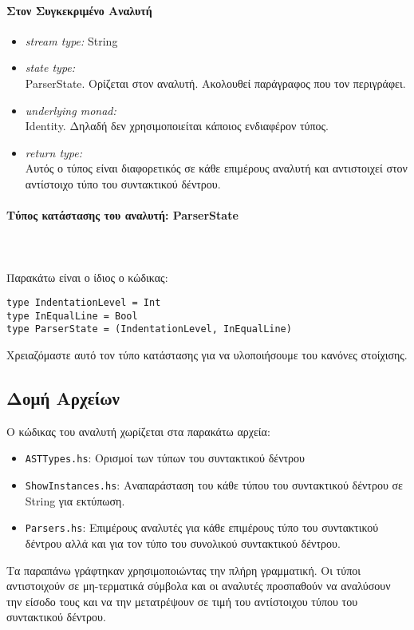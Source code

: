 \documentclass[diploma]{softlab-thesis}
\def\pend{\mbox{}\\\\}
\begin{document}
\paragraph{Στον Συγκεκριμένο Αναλυτή}
\begin{itemize}
\item
  \textit{stream type:} String
\item
  \textit{state type:}
  \\ParserState. Ορίζεται στον αναλυτή. Ακολουθεί παράγραφος που τον
  περιγράφει.
\item
  \textit{underlying monad:}
  \\
  Identity. Δηλαδή δεν χρησιμοποιείται κάποιος ενδιαφέρον τύπος.
\item
  \textit{return type:}
  \\
  Αυτός ο τύπος είναι διαφορετικός σε κάθε επιμέρους αναλυτή και αντιστοιχεί
  στον αντίστοιχο τύπο του συντακτικού δέντρου.
\end{itemize}

\paragraph{Τύπος κατάστασης του αναλυτή: ParserState}\pend
Παρακάτω είναι ο ίδιος ο κώδικας:
\begin{verbatim}
type IndentationLevel = Int
type InEqualLine = Bool
type ParserState = (IndentationLevel, InEqualLine)
\end{verbatim}
Χρειαζόμαστε αυτό τον τύπο κατάστασης για να υλοποιήσουμε του κανόνες
στοίχισης.

\newpage

\subsection{Δομή Αρχείων}

Ο κώδικας του αναλυτή χωρίζεται στα παρακάτω αρχεία:
\begin{itemize}
\item
\verb|ASTTypes.hs|: Ορισμοί των τύπων του συντακτικού δέντρου
\item
\verb|ShowInstances.hs|:
Αναπαράσταση του κάθε τύπου του συντακτικού δέντρου σε String για εκτύπωση.
\item
\verb|Parsers.hs|:
Επιμέρους αναλυτές για κάθε επιμέρους τύπο του συντακτικού δέντρου αλλά και για
τον τύπο του συνολικού συντακτικού δέντρου.
\end{itemize}
Τα παραπάνω γράφτηκαν χρησιμοποιώντας την πλήρη γραμματική. Οι τύποι
αντιστοιχούν σε μη-τερματικά σύμβολα και οι αναλυτές προσπαθούν να αναλύσουν την
είσοδο τους και να την μετατρέψουν σε τιμή του αντίστοιχου τύπου του
συντακτικού δέντρου.
\end{document}
